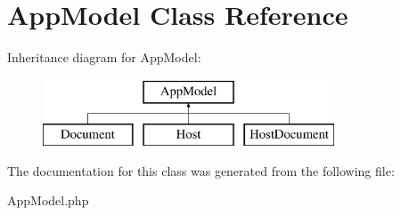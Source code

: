 \hypertarget{classAppModel}{
\section{\-App\-Model \-Class \-Reference}
\label{classAppModel}
}
\-Inheritance diagram for \-App\-Model\-:\begin{figure}[H]
\begin{center}
\leavevmode
\includegraphics[height=2.000000cm]{classAppModel}
\end{center}
\end{figure}


\-The documentation for this class was generated from the following file\-:\begin{DoxyCompactItemize}
\item 
\-App\-Model.\-php\end{DoxyCompactItemize}

